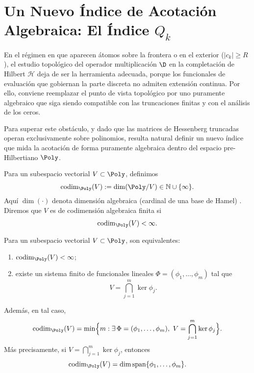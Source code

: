 \section{Un Nuevo Índice de Acotación Algebraica: El Índice $Q_k$}

En el régimen en que aparecen átomos sobre la frontera o en el exterior ($|c_k|\ge R$), el estudio topológico del operador multiplicación $\D$ en la completación de Hilbert $\mathcal{H}$ deja de ser la herramienta adecuada, porque los funcionales de evaluación que gobiernan la parte discreta no admiten extensión continua. Por ello, conviene reemplazar el punto de vista topológico por uno puramente algebraico que siga siendo compatible con las truncaciones finitas y con el análisis de los ceros.

Para superar este obstáculo, y dado que las matrices de Hessenberg truncadas operan exclusivamente sobre polinomios, resulta natural definir un nuevo índice que mida la acotación de forma puramente algebraica dentro del espacio pre-Hilbertiano $\Poly$.

\begin{defn}\label{def:codim_alg}
	Para un subespacio vectorial $V\subset \Poly$, definimos
	\[
		\operatorname{codim}_{\Poly}(V):=\dim(\Poly/V)\in \mathbb N\cup\{\infty\}.
	\]
	Aquí $\dim(\cdot)$ denota dimensión algebraica (cardinal de una base de Hamel) \cite{hormander1989linearfunctionalanalysis,Aizpuru2009Apuntes}.
	Diremos que $V$ es de codimensión algebraica finita si
	\[
		\operatorname{codim}_{\Poly}(V)<\infty.
	\]
\end{defn}

\begin{prop}\label{prop:finite-codim-kernels}
	Para un subespacio vectorial $V\subset \Poly$, son equivalentes:
	\begin{enumerate}
		\item $\operatorname{codim}_{\Poly}(V)<\infty$;
		\item existe un sistema finito de funcionales lineales $\Phi=(\phi_1,\dots,\phi_m)$
		      tal que
		      \[
			      V=\bigcap_{j=1}^m \ker \phi_j.
		      \]
	\end{enumerate}
	Además, en tal caso,
	\[
		\operatorname{codim}_{\Poly}(V)
		=
		\min\Bigl\{m:\exists\,\Phi=(\phi_1,\dots,\phi_m),\
		V=\bigcap_{j=1}^m\ker\phi_j\Bigr\}.
	\]
	Más precisamente, si $V=\bigcap_{j=1}^m\ker\phi_j$, entonces
	\[
		\operatorname{codim}_{\Poly}(V)=\dim\operatorname{span}\{\phi_1,\dots,\phi_m\}.
	\]
\end{prop}


